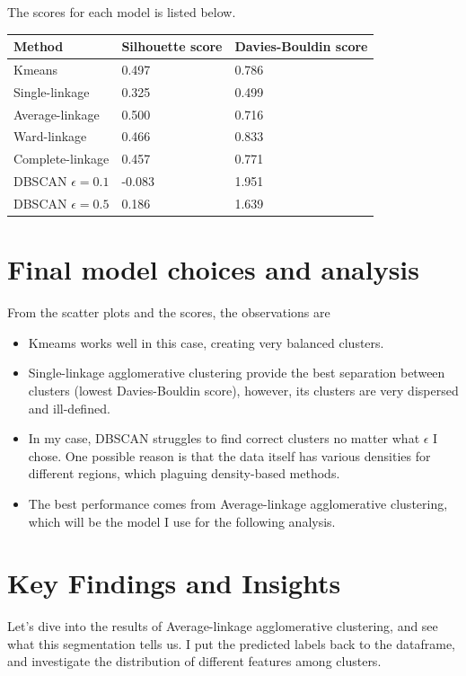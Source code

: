 \documentclass[11pt]{article}
\begin{document}
\newpage

The scores for each model is listed below.

\begin{table}[h]
\begin{tabular}{lll}
\hline
\hline
Method           & Silhouette score & Davies-Bouldin score \\
\hline
Kmeans           & 0.497            & 0.786                \\
Single-linkage   & 0.325            & 0.499                \\
Average-linkage  & 0.500            & 0.716                \\
Ward-linkage     & 0.466            & 0.833                \\
Complete-linkage & 0.457            & 0.771                \\
DBSCAN $\epsilon=0.1$ & -0.083           & 1.951                \\
DBSCAN $\epsilon=0.5$ & 0.186            & 1.639                \\
\hline
\hline
\end{tabular}
\end{table}

\section{Final model choices and analysis}\label{section-pred}
From the scatter plots and the scores, the observations are
\begin{itemize}
\item Kmeams works well in this case, creating very balanced clusters.
\item Single-linkage agglomerative clustering provide the best separation between clusters (lowest Davies-Bouldin score), however, its clusters are very dispersed and ill-defined.
\item In my case, DBSCAN struggles to find correct clusters no matter what $\epsilon$ I chose. One possible reason is that the data itself has various densities for different regions, which plaguing density-based methods.
\item The best performance comes from Average-linkage agglomerative clustering, which will be the model I use for the following analysis.
\end{itemize}

\section{Key Findings and Insights}\label{section-find}
Let's dive into the results of Average-linkage agglomerative clustering, and see what this segmentation tells us.
I put the predicted labels back to the dataframe, and investigate the distribution of different features among clusters.
\end{document}

